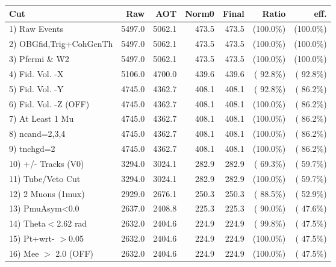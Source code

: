  \begin{table}[h!]\centering
 \begin{tabular}{||l||r|r|r|r|r|r||}
 \hline
 \hline
 Cut & Raw & AOT & Norm0 & Final & Ratio & eff.       \\
 \hline
  1) Raw Events           &       5497.0 &       5062.1 &        473.5 &        473.5 & (100.0\%) & (100.0\%) \\
  2) OBGfid,Trig+CohGenTh &       5497.0 &       5062.1 &        473.5 &        473.5 & (100.0\%) & (100.0\%) \\
  3) Pfermi \& W2         &       5497.0 &       5062.1 &        473.5 &        473.5 & (100.0\%) & (100.0\%) \\
  4) Fid. Vol. -X         &       5106.0 &       4700.0 &        439.6 &        439.6 & ( 92.8\%) & ( 92.8\%) \\
  5) Fid. Vol. -Y         &       4745.0 &       4362.7 &        408.1 &        408.1 & ( 92.8\%) & ( 86.2\%) \\
  6) Fid. Vol. -Z (OFF)   &       4745.0 &       4362.7 &        408.1 &        408.1 & (100.0\%) & ( 86.2\%) \\
  7) At Least 1 Mu        &       4745.0 &       4362.7 &        408.1 &        408.1 & (100.0\%) & ( 86.2\%) \\
  8) ncand=2,3,4          &       4745.0 &       4362.7 &        408.1 &        408.1 & (100.0\%) & ( 86.2\%) \\
  9) tnchgd=2             &       4745.0 &       4362.7 &        408.1 &        408.1 & (100.0\%) & ( 86.2\%) \\
 10) +/- Tracks (V0)      &       3294.0 &       3024.1 &        282.9 &        282.9 & ( 69.3\%) & ( 59.7\%) \\
 11) Tube/Veto Cut        &       3294.0 &       3024.1 &        282.9 &        282.9 & (100.0\%) & ( 59.7\%) \\
 12) 2 Muons (1mux)       &       2929.0 &       2676.1 &        250.3 &        250.3 & ( 88.5\%) & ( 52.9\%) \\
 13) PmuAsym<0.0          &       2637.0 &       2408.8 &        225.3 &        225.3 & ( 90.0\%) & ( 47.6\%) \\
 14) Theta$<$2.62 rad     &       2632.0 &       2404.6 &        224.9 &        224.9 & ( 99.8\%) & ( 47.5\%) \\
 15) Pt+wrt- $>$0.05      &       2632.0 &       2404.6 &        224.9 &        224.9 & (100.0\%) & ( 47.5\%) \\
 16) Mee $>$ 2.0  (OFF)   &       2632.0 &       2404.6 &        224.9 &        224.9 & (100.0\%) & ( 47.5\%) \\

\end{tabular}
\end{table}
